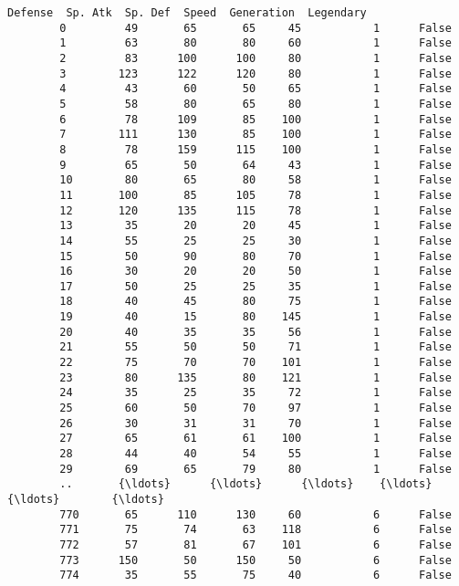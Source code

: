 \documentclass[11pt]{article}
\begin{document}
\begin{Verbatim}[commandchars=\\\{\}]
             Defense  Sp. Atk  Sp. Def  Speed  Generation  Legendary  
        0         49       65       65     45           1      False  
        1         63       80       80     60           1      False  
        2         83      100      100     80           1      False  
        3        123      122      120     80           1      False  
        4         43       60       50     65           1      False  
        5         58       80       65     80           1      False  
        6         78      109       85    100           1      False  
        7        111      130       85    100           1      False  
        8         78      159      115    100           1      False  
        9         65       50       64     43           1      False  
        10        80       65       80     58           1      False  
        11       100       85      105     78           1      False  
        12       120      135      115     78           1      False  
        13        35       20       20     45           1      False  
        14        55       25       25     30           1      False  
        15        50       90       80     70           1      False  
        16        30       20       20     50           1      False  
        17        50       25       25     35           1      False  
        18        40       45       80     75           1      False  
        19        40       15       80    145           1      False  
        20        40       35       35     56           1      False  
        21        55       50       50     71           1      False  
        22        75       70       70    101           1      False  
        23        80      135       80    121           1      False  
        24        35       25       35     72           1      False  
        25        60       50       70     97           1      False  
        26        30       31       31     70           1      False  
        27        65       61       61    100           1      False  
        28        44       40       54     55           1      False  
        29        69       65       79     80           1      False  
        ..       {\ldots}      {\ldots}      {\ldots}    {\ldots}         {\ldots}        {\ldots}  
        770       65      110      130     60           6      False  
        771       75       74       63    118           6      False  
        772       57       81       67    101           6      False  
        773      150       50      150     50           6      False  
        774       35       55       75     40           6      False  

\end{Verbatim}
\end{document}
